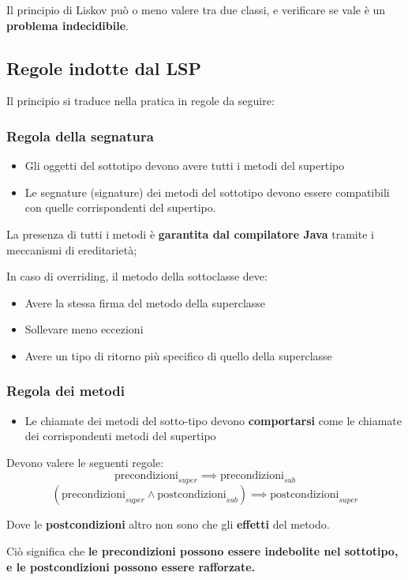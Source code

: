 \documentclass[a4paper,10pt]{article}
\begin{document}
Il principio di Liskov può o meno valere tra due classi, e verificare se vale è un \textbf{problema indecidibile}.
\subsection{Regole indotte dal LSP}
Il principio si traduce nella pratica in regole da seguire:
\subsubsection{Regola della segnatura}
\begin{itemize}
 \item Gli oggetti del sottotipo devono avere tutti i metodi del supertipo
 \item Le segnature (signature) dei metodi del sottotipo devono essere compatibili con quelle corrispondenti del supertipo.
\end{itemize}
La presenza di tutti i metodi è \textbf{garantita dal compilatore Java} tramite i meccanismi di ereditarietà;\smallskip

In caso di overriding, il metodo della sottoclasse deve:
\begin{itemize}
 \item Avere la stessa firma del metodo della superclasse
 \item Sollevare meno eccezioni
 \item Avere un tipo di ritorno più specifico di quello della superclasse

\end{itemize}

\subsubsection{Regola dei metodi}
\begin{itemize}
 \item Le chiamate dei metodi del sotto-tipo devono \textbf{comportarsi} come le chiamate dei corrispondenti metodi del supertipo
\end{itemize}

Devono valere le seguenti regole:
\[ \text{precondizioni}_{super} \implies \text{precondizioni}_{sub} \]
\[ (\text{precondizioni}_{super} \wedge \text{postcondizioni}_{sub}) \implies \text{postcondizioni}_{super} \]

Dove le \textbf{postcondizioni} altro non sono che gli \textbf{effetti} del metodo.
\medskip

Ciò significa che \textbf{le precondizioni possono essere indebolite nel sottotipo, e le postcondizioni possono essere rafforzate.}
\end{document}
